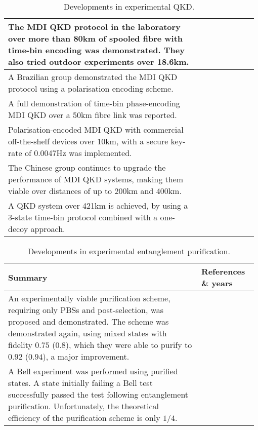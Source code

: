 \begin{table*}[!htbp]
\begin{tabular}{|p{0.755\linewidth}|p{0.22\linewidth}|}
The MDI QKD protocol in the laboratory over more than 80km of spooled fibre with time-bin encoding was demonstrated. They also tried outdoor experiments over 18.6km. &\cite{bib:PRL_111_130501}\\
\hline
A Brazilian group demonstrated the MDI QKD protocol using a polarisation encoding scheme. &\cite{bib:PRA_88_052303}\\
\hline
A full demonstration of time-bin phase-encoding MDI QKD over a 50km fibre link was reported. &\cite{bib:PRL_111_130502}\\
\hline
Polarisation-encoded MDI QKD with commercial off-the-shelf devices over 10km, with a secure key-rate of 0.0047Hz was implemented. &\cite{bib:PRL_112_190503}\\
\hline
The Chinese group continues to upgrade the performance of MDI QKD systems, making them viable over distances of up to 200km and 400km. &\cite{bib:PRL_113_190501, bib:yin2016measurement}
\\
\hline
A QKD system over 421km is achieved, by using a 3-state time-bin protocol combined with a one-decoy approach. & \cite{bib:boaron2018secure}
\\
\hline
\end{tabular}
\captionspacetab \caption{Developments in experimental QKD.} \label{tab:QKD_table}
\end{table*}

\begin{table*}[!htbp]
\begin{tabular}{|p{0.755\linewidth}|p{0.22\linewidth}|}
	\hline
	\textbf{Summary} & \textbf{References \& years} \\	\hline \hline
	An experimentally viable purification scheme, requiring only PBSs and post-selection, was proposed and demonstrated. The scheme was demonstrated again, using mixed states with fidelity $0.75$ ($0.8$), which they were able to purify to $0.92$ ($0.94$), a major improvement. & \cite{bib:Pan01, bib:Pan03} \\
	\hline
	A Bell experiment was performed using purified states. A state initially failing a Bell test successfully passed the test following entanglement purification. Unfortunately, the theoretical efficiency of the purification scheme is only $1/4$. & \cite{bib:PRL_94_040504, bib:Pan01} \\
	\hline
\end{tabular}
\captionspacetab \caption{Developments in experimental entanglement purification.} \label{tab:ent_pur}
\end{table*}


